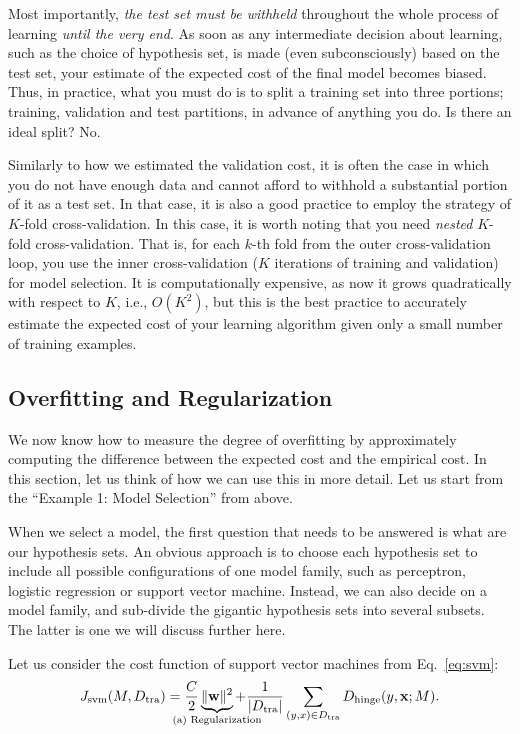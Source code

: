 \documentclass{report}
\newcommand{\vect}[1]{\mathbf{#1}}
\newcommand{\vx}[0]{\vect{x}}
\newcommand{\vw}[0]{\vect{w}}
\newcommand{\hinge}{\text{hinge}}
\newcommand{\tra}{\text{tra}}
\begin{document}
Most importantly, {\it the test set must be withheld} throughout the whole
process of learning {\it until the very end}.  As soon as any intermediate
decision about learning, such as the choice of hypothesis set, is made (even
subconsciously) based on the test set, your estimate of the expected cost of the
final model becomes biased. Thus, in practice, what you must do is to split a
training set into three portions; training, validation and test partitions, in
advance of anything you do. Is there an ideal split? No.

Similarly to how we estimated the validation cost, it is often the case in which
you do not have enough data and cannot afford to withhold a substantial portion
of it as a test set. In that case, it is also a good practice to employ the
strategy of $K$-fold cross-validation. In this case, it is worth noting that you
need {\it nested} $K$-fold cross-validation. That is, for each $k$-th fold from
the outer cross-validation loop, you use the inner cross-validation ($K$
iterations of training and validation) for model selection. It is
computationally expensive, as now it grows quadratically with respect to $K$,
i.e., $O(K^2)$, but this is the best practice to accurately estimate the
expected cost of your learning algorithm given only a small number of training
examples. 

\subsection{Overfitting and Regularization}
\label{sec:regularization}

We now know how to measure the degree of overfitting by approximately computing
the difference between the expected cost and the empirical cost. In this
section, let us think of how we can use this in more detail.  Let us start from
the ``Example 1: Model Selection'' from above. 

When we select a model, the first question that needs to be answered is what are
our hypothesis sets. An obvious approach is to choose each hypothesis set to
include all possible configurations of one model family, such as perceptron,
logistic regression or support vector machine. Instead, we can also decide on a
model family, and sub-divide the gigantic hypothesis sets into several subsets.
The latter is one we will discuss further here.

Let us consider the cost function of support vector machines from
Eq.~\eqref{eq:svm}: 
\begin{align*}
    J_{\text{svm}}(M,D_{\tra}) = \frac{C}{2}
    \underbrace{\|\vw\|^2}_{\mathclap{\text{(a) Regularization}}} + 
    \frac{1}{|D_{\tra}|} \sum_{(y,x)
    \in D_{\tra}} D_{\hinge}(y, \vx; M).
\end{align*}
\end{document}
